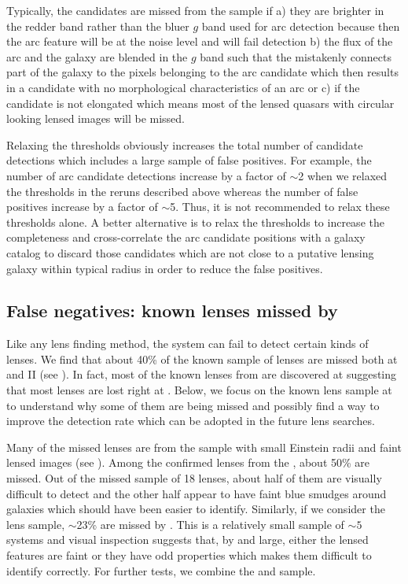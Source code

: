\documentclass[useAMS,usenatbib,a4paper]{mn2e}
\begin{document}
Typically, the candidates are missed from the \af sample if a) they are
brighter in the redder band rather than the bluer $g$ band used for arc
detection because then the arc feature will be at the noise level and
will fail detection b) the flux of the arc and the galaxy are
blended in the $g$ band such that the \af mistakenly connects part of the
galaxy to the pixels belonging to the arc candidate which then results in a
candidate with no morphological characteristics of an arc or c) if the
candidate is not elongated which means most of the lensed quasars with
circular looking lensed images will be missed.

Relaxing the thresholds obviously increases the total number of
candidate detections which includes a large sample of false positives.
For example, the number of arc candidate detections increase by a factor
of $\sim$2 when we relaxed the thresholds in the reruns described above
whereas the number of false positives increase by a factor of $\sim$5.
Thus, it is not recommended to relax these thresholds alone. A better
alternative is to relax the thresholds to increase the completeness and
cross-correlate the arc candidate positions with a galaxy catalog to
discard those candidates which are not close to a putative lensing
galaxy within typical radius in order to reduce the false positives.




\subsection{False negatives: known lenses missed by \sw}
\label{sec:fn}
Like any lens finding method, the \sw system can fail to detect certain
kinds of lenses.  We find that about 40\% of the known sample of lenses
are missed both at \StageOne and II (see ). In fact, most
of the known lenses from \StageOne are discovered at \StageTwo suggesting
that most lenses are lost right at \StageOne. Below, we focus on the known
lens sample at \StageOne to understand why some of them are being missed
and possibly find a way to improve the detection rate which can be
adopted in the future \sw lens searches.

Many of the missed lenses are from the \rf sample with small
Einstein radii and faint lensed images (see ). Among
the confirmed lenses from the \rf, about 50\% are missed. Out of the
missed sample of 18 lenses, about half of them are visually difficult to
detect and the other half appear to have faint blue smudges around
galaxies which should have been easier to identify. Similarly,
if we consider the \af lens sample, $\sim$23\% are missed by \sw. This
is a relatively small sample of $\sim 5$ systems and visual inspection
suggests that, by and large, either the lensed features are faint
or they have odd properties which makes them difficult to identify
correctly. For further tests, we combine the \rf and \af sample.
\end{document}
